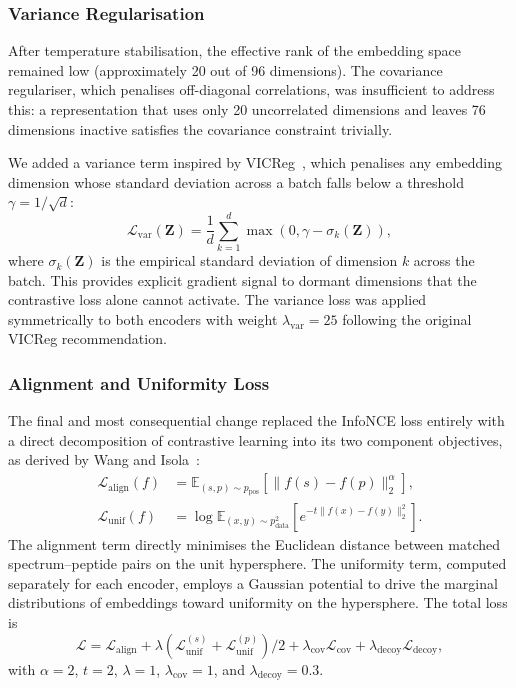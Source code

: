 \documentclass[pdflatex,sn-mathphys-num]{sn-jnl}%
\theoremstyle{thmstyleone}%
\theoremstyle{thmstyletwo}%
\theoremstyle{thmstylethree}%
\begin{document}
\subsubsection{Variance Regularisation}

After temperature stabilisation, the effective rank of the embedding space remained low (approximately 20 out of 96 dimensions). The covariance regulariser, which penalises off-diagonal correlations, was insufficient to address this: a representation that uses only 20 uncorrelated dimensions and leaves 76 dimensions inactive satisfies the covariance constraint trivially.

We added a variance term inspired by VICReg~\cite{bardes2022vicreg}, which penalises any embedding dimension whose standard deviation across a batch falls below a threshold $\gamma = 1/\sqrt{d}$:
\begin{equation}
\mathcal{L}_\text{var}(\mathbf{Z}) = \frac{1}{d}\sum_{k=1}^{d} \max(0, \gamma - \sigma_k(\mathbf{Z})),
\end{equation}
where $\sigma_k(\mathbf{Z})$ is the empirical standard deviation of dimension $k$ across the batch. This provides explicit gradient signal to dormant dimensions that the contrastive loss alone cannot activate. The variance loss was applied symmetrically to both encoders with weight $\lambda_\text{var} = 25$ following the original VICReg recommendation.

\subsubsection{Alignment and Uniformity Loss}

The final and most consequential change replaced the InfoNCE loss entirely with a direct decomposition of contrastive learning into its two component objectives, as derived by Wang and Isola~\cite{wang2020understanding}:
\begin{align}
\mathcal{L}_\text{align}(f) &= \mathbb{E}_{(s,p)\sim p_\text{pos}}\left[\|f(s) - f(p)\|_2^\alpha\right], \\
\mathcal{L}_\text{unif}(f) &= \log \mathbb{E}_{(x,y) \sim p_\text{data}^2}\left[e^{-t\|f(x)-f(y)\|_2^2}\right].
\end{align}
The alignment term directly minimises the Euclidean distance between matched spectrum--peptide pairs on the unit hypersphere. The uniformity term, computed separately for each encoder, employs a Gaussian potential to drive the marginal distributions of embeddings toward uniformity on the hypersphere. The total loss is
\begin{equation}
\mathcal{L} = \mathcal{L}_\text{align} + \lambda \left(\mathcal{L}_\text{unif}^{(s)} + \mathcal{L}_\text{unif}^{(p)}\right)/2 + \lambda_\text{cov} \mathcal{L}_\text{cov} + \lambda_\text{decoy} \mathcal{L}_\text{decoy},
\end{equation}
with $\alpha = 2$, $t = 2$, $\lambda = 1$, $\lambda_\text{cov} = 1$, and $\lambda_\text{decoy} = 0.3$.
\end{document}
